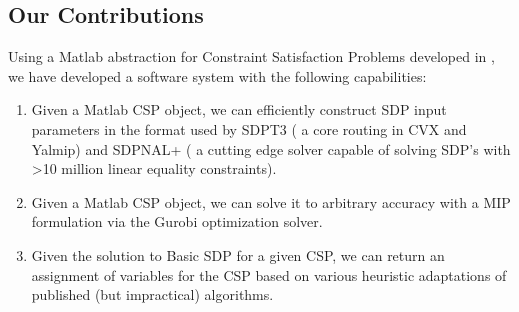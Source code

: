 \documentclass[11pt]{article} %
\begin{document}




\subsection{Our Contributions}
 
Using a Matlab abstraction for Constraint Satisfaction Problems developed in \cite{dwivedi2015introduction}, we have developed a software system with the following capabilities:

\begin{enumerate}
\item Given a Matlab CSP object, we can efficiently construct SDP input parameters in the format used by SDPT3 ( a core routing in CVX and Yalmip) and SDPNAL+ ( a cutting edge solver capable of solving SDP's with >10 million linear equality constraints).

\item Given a Matlab CSP object, we can solve it to arbitrary accuracy with a MIP formulation via the Gurobi optimization solver.

\item Given the solution to Basic SDP for a given CSP, we can return an assignment of variables for the CSP based on various heuristic adaptations of published (but impractical) algorithms.
\end{enumerate}
\end{document}
